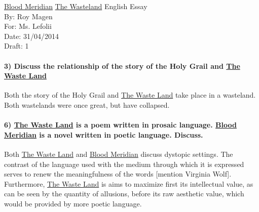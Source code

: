 \documentclass[12pt]{article}
\begin{document}
	\begin{titlepage}
		\noindent \uline{Blood Meridian} \uline{The Wasteland} English Essay \\
		By: Roy Magen \\
		For:  Ms. Lefolii \\
		Date: 31/04/2014 \\
		Draft: 1
	\end{titlepage}

	\paragraph{3) Discuss the relationship of the story of the Holy Grail and \uline{The Waste Land}}
		Both the story of the Holy Grail and \uline{The Waste Land} take place in a wasteland. Both wastelands were once great, but have collapsed.	

	\paragraph{6) \uline{The Waste Land} is a poem written in prosaic language. \uline{Blood Meridian} is a novel written in poetic language. Discuss.}
		Both \uline{The Waste Land} and \uline{Blood Meridian} discuss dystopic settings. The contrast of the language used with the medium through which it is expressed serves to renew the meaningfulness of the words [mention Virginia Wolf]. Furthermore, \uline{The Waste Land} is aims to maximize first its intellectual value, as can be seen by the quantity of allusions, before its raw aesthetic value, which would be provided by more poetic language. 
\end{document}
